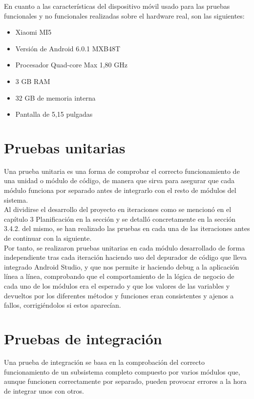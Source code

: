 En cuanto a las características del dispositivo móvil usado para las pruebas funcionales y no funcionales realizadas sobre el hardware real, son las siguientes:

\begin{itemize}
\item Xiaomi MI5
\item Versión de Android 6.0.1 MXB48T
\item Procesador Quad-core Max 1,80 GHz
\item 3 GB RAM
\item 32 GB de memoria interna
\item Pantalla de 5,15 pulgadas
\end{itemize}

\section{Pruebas unitarias}

Una prueba unitaria es una forma de comprobar el correcto funcionamiento de una unidad o módulo de código, de manera que sirva para asegurar que cada módulo funciona por separado antes de integrarlo con el resto de módulos del sistema.\\

Al dividirse el desarrollo del proyecto en iteraciones como se mencionó en el capítulo 3 Planificación en la sección y se detalló concretamente en la sección 3.4.2. del mismo, se han realizado las pruebas en cada una de las iteraciones antes de continuar con la siguiente.\\

Por tanto, se realizaron pruebas unitarias en cada módulo desarrollado de forma independiente tras cada iteración haciendo uso del depurador de código que lleva integrado Android Studio, y que nos permite ir haciendo debug a la aplicación línea a línea, comprobando que el comportamiento de la lógica de negocio de cada uno de los módulos era el esperado y que los valores de las variables y devueltos por los diferentes métodos y funciones eran consistentes y ajenos a fallos, corrigiéndolos si estos aparecían.

\section{Pruebas de integración}

Una prueba de integración se basa en la comprobación del correcto funcionamiento de un subsistema completo compuesto por varios módulos que, aunque funcionen correctamente por separado, pueden provocar errores a la hora de integrar unos con otros.\\

